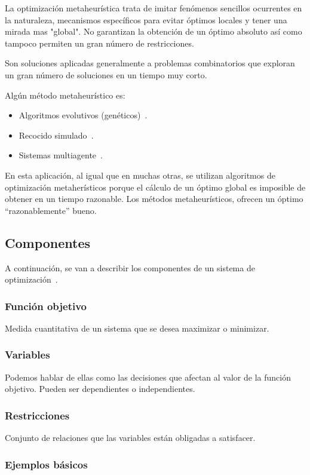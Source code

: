 La optimización metaheurística trata de imitar fenómenos sencillos ocurrentes en la naturaleza, mecanismos específicos para evitar óptimos locales y tener una mirada mas "global". No garantizan la obtención de un óptimo absoluto así como tampoco permiten un gran número de restricciones.

Son soluciones aplicadas generalmente a problemas combinatorios que exploran un gran número de soluciones en un tiempo muy corto.

Algún método metaheurístico es:
\begin{itemize}
	\item Algoritmos evolutivos (genéticos)~\cite{pdf:algoritmosGeneticos}.
	\item Recocido simulado~\cite{web:recocidoSimulado}.
	\item Sistemas multiagente~\cite{web:sistemasMultiagente}.
\end{itemize}

En esta aplicación, al igual que en muchas otras, se utilizan algoritmos de optimización metaherísticos porque el cálculo de un óptimo global es imposible de obtener en un tiempo razonable. Los métodos metaheurísticos, ofrecen un óptimo ``razonablemente'' bueno.

\subsection{Componentes}
A continuación, se van a describir los componentes de un sistema de optimización~\cite{pdf:optimizacion}.

\subsubsection{Función objetivo}
Medida cuantitativa de un sistema que se desea maximizar o minimizar.

\subsubsection{Variables}
Podemos hablar de ellas como las decisiones que afectan al valor de la función objetivo. Pueden ser dependientes o independientes.

\subsubsection{Restricciones}
Conjunto de relaciones que las variables están obligadas a satisfacer.

\subsubsection{Ejemplos básicos}


